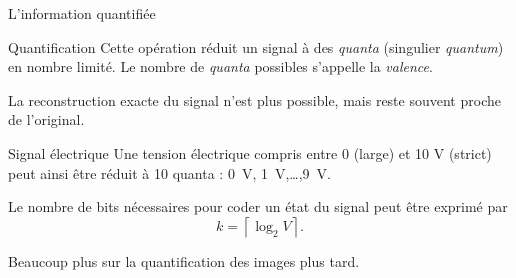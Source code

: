 \begin{frame}{L'information quantifiée}
  \begin{block}{Quantification}
    Cette opération réduit un signal à des \emph{quanta} (singulier
    \emph{quantum}) en nombre limité. Le nombre de \emph{quanta}
    possibles s'appelle la \emph{valence}.

    La reconstruction exacte du signal n'est plus possible, mais reste souvent
    proche de l'original.
  \end{block}
  \begin{example}{Signal électrique}
    Une tension électrique compris entre 0 (large) et 10 V (strict) peut
    ainsi être réduit à 10 quanta : 0~V, 1~V,\dots,9~V.
  \end{example}
  Le nombre de bits nécessaires pour coder un état du signal peut être
  exprimé par $$k=\left\lceil\log_2 V\right\rceil.$$

  \dialoginformation Beaucoup plus sur la quantification des images plus tard.

\end{frame}
